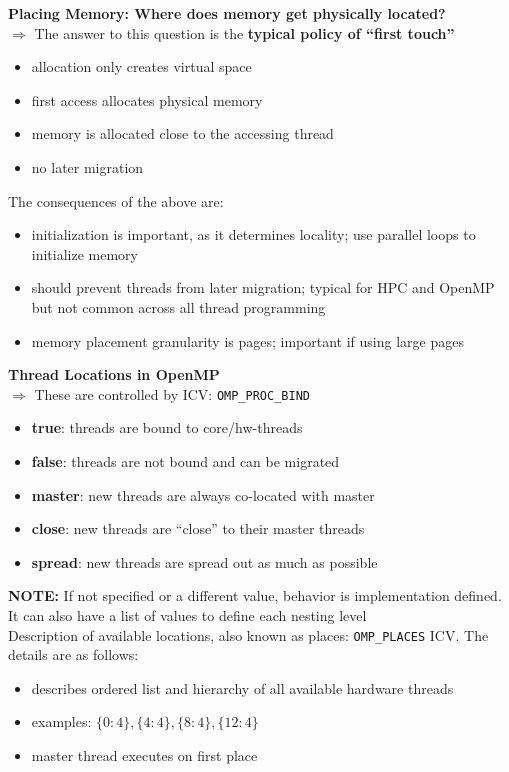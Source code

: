 \documentclass[12pt, a4paper]{report}
\begin{document}
\begin{itemize}
    {\bfseries{Placing Memory: Where does memory get physically located?}}\\[0.5em]
    $\Rightarrow$ The answer to this question is the {\bfseries{typical policy of ``first touch''}}
    \begin{itemize}
        \item allocation only creates virtual space
        \item first access allocates physical memory
        \item memory is allocated close to the accessing thread
        \item no later migration
    \end{itemize}
    The consequences of the above are:
    \begin{itemize}
        \item initialization is important, as it determines locality; use parallel loops to initialize memory
        \item should prevent threads from later migration; typical for HPC and OpenMP but not common across all thread programming
        \item memory placement granularity is pages; important if using large pages
    \end{itemize}

    {\bfseries{Thread Locations in OpenMP}}\\[0.5em]
    $\Rightarrow$ These are controlled by ICV: \qquad\qquad \verb$OMP_PROC_BIND$
    \begin{itemize}
        \item {\bfseries{true}}: threads are bound to core/hw-threads
        \item {\bfseries{false}}: threads are not bound and can be migrated
        \item {\bfseries{master}}: new threads are always co-located with master
        \item {\bfseries{close}}: new threads are ``close'' to their master threads
        \item {\bfseries{spread}}: new threads are spread out as much as possible
    \end{itemize}
    {\bfseries{NOTE:}} If not specified or a different value, behavior is implementation defined. It can also have a list of values to define each nesting level\\
    \vspace{2mm}
    Description of available locations, also known as places: \verb$OMP_PLACES$ ICV. The details are as follows:
    \begin{itemize}
        \item describes ordered list and hierarchy of all available hardware threads
        \item examples: $\{0:4\}, \{4:4\}, \{8:4\}, \{12:4\}$
        \item master thread executes on first place
    \end{itemize}
\end{itemize}
\end{document}
